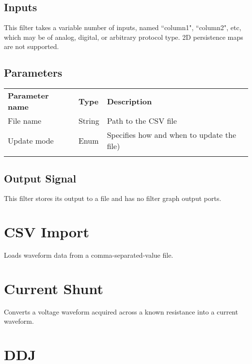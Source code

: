 \subsection{Inputs}

This filter takes a variable number of inputs, named ``column1", ``column2", etc, which may be of analog, digital, or
arbitrary protocol type. 2D persistence maps are not supported.

\subsection{Parameters}

\begin{tabularx}{16cm}{llX}
\thickhline
\textbf{Parameter name} & \textbf{Type} & \textbf{Description} \\
\thickhline
File name & String & Path to the CSV file\\
\thinhline
Update mode & Enum & Specifies how and when to update the file)\\
\thickhline
\end{tabularx}

\subsection{Output Signal}

This filter stores its output to a file and has no filter graph output ports.

\pagebreak
\section{CSV Import}

Loads waveform data from a comma-separated-value file.


\pagebreak
\section{Current Shunt}

Converts a voltage waveform acquired across a known resistance into a current waveform.

\pagebreak
\section{DDJ}
\label{filter:ddj}

